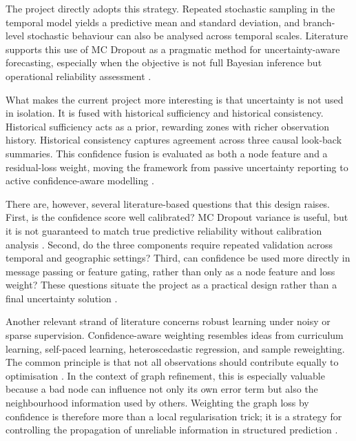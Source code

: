 \documentclass[12pt,a4paper]{report}
\begin{document}
The project directly adopts this strategy. Repeated stochastic sampling in the temporal model yields a predictive mean and standard deviation, and branch-level stochastic behaviour can also be analysed across temporal scales. Literature supports this use of MC Dropout as a pragmatic method for uncertainty-aware forecasting, especially when the objective is not full Bayesian inference but operational reliability assessment \cite{gal2016dropout,zhuang2022sparse}.

What makes the current project more interesting is that uncertainty is not used in isolation. It is fused with historical sufficiency and historical consistency. Historical sufficiency acts as a prior, rewarding zones with richer observation history. Historical consistency captures agreement across three causal look-back summaries. This confidence fusion is evaluated as both a node feature and a residual-loss weight, moving the framework from passive uncertainty reporting to active confidence-aware modelling \cite{wang2024gnnuncertaintysurvey}.

There are, however, several literature-based questions that this design raises. First, is the confidence score well calibrated? MC Dropout variance is useful, but it is not guaranteed to match true predictive reliability without calibration analysis \cite{gal2016dropout,uncertaintygnnsurvey2025}. Second, do the three components require repeated validation across temporal and geographic settings? Third, can confidence be used more directly in message passing or feature gating, rather than only as a node feature and loss weight? These questions situate the project as a practical design rather than a final uncertainty solution \cite{wang2024gnnuncertaintysurvey,hu2025uncertaintygnn}.

Another relevant strand of literature concerns robust learning under noisy or sparse supervision. Confidence-aware weighting resembles ideas from curriculum learning, self-paced learning, heteroscedastic regression, and sample reweighting. The common principle is that not all observations should contribute equally to optimisation \cite{ren2018reweight,shi2023selfpaced}. In the context of graph refinement, this is especially valuable because a bad node can influence not only its own error term but also the neighbourhood information used by others. Weighting the graph loss by confidence is therefore more than a local regularisation trick; it is a strategy for controlling the propagation of unreliable information in structured prediction \cite{hu2025uncertaintygnn,park2022confidenceaware}.
\end{document}
